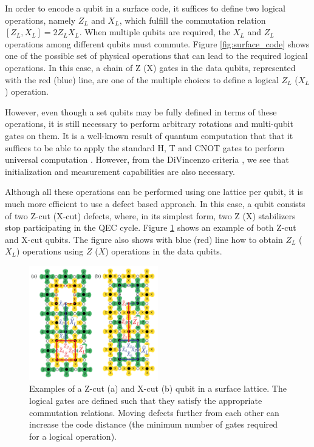 In order to encode a qubit in a surface code, it suffices to define two logical
operations, namely $Z_L$ and $X_L$, which fulfill the commutation relation
$[Z_L,X_L] = 2Z_LX_L$. When multiple qubits are required, the $X_L$ and $Z_L$
operations among different qubits must commute. Figure \ref{fig:surface_code}
shows one of the possible set of physical operations that can lead to the
required logical operations. In this case, a chain of Z (X) gates in the data
qubits, represented with the red (blue) line, are one of the multiple choices to
define a logical $Z_L$ ($X_L$) operation.

However, even though a set qubits may be fully defined in terms of these
operations, it is still necessary to perform arbitrary rotations and multi-qubit
gates on them. It is a well-known result of quantum computation that that it
suffices to be able to apply the standard H, T and CNOT gates to perform
universal computation \cite{nielsen_chuang_2010}. However, from the DiVincenzo
criteria \cite{DiCincenzoCriteria}, we see that initialization and
measurement capabilities are also necessary.

Although all these operations can be performed using one lattice per qubit,
it is much more efficient to use a defect based approach. In this case, a qubit
consists of two Z-cut (X-cut) defects, where, in its simplest form, two Z (X)
stabilizers stop participating in the QEC cycle. Figure \ref{fig:cuts} shows an
example of both Z-cut and X-cut qubits. The figure also shows with blue
(red) line how to obtain $Z_L$ ($X_L$) operations using $Z$ ($X$) operations in
the data qubits.
\begin{figure}[htbp]
  \centering
  \includegraphics[width=0.5\textwidth]{images/surface_code_cuts.pdf}
  \caption{Examples of a Z-cut (a) and X-cut (b) qubit in a surface lattice. The
  logical gates are defined such that they satisfy the appropriate commutation
  relations. Moving defects further from each other can increase the code
  distance (the minimum number of gates required for a logical operation).}
  \label{fig:cuts}
\end{figure}

